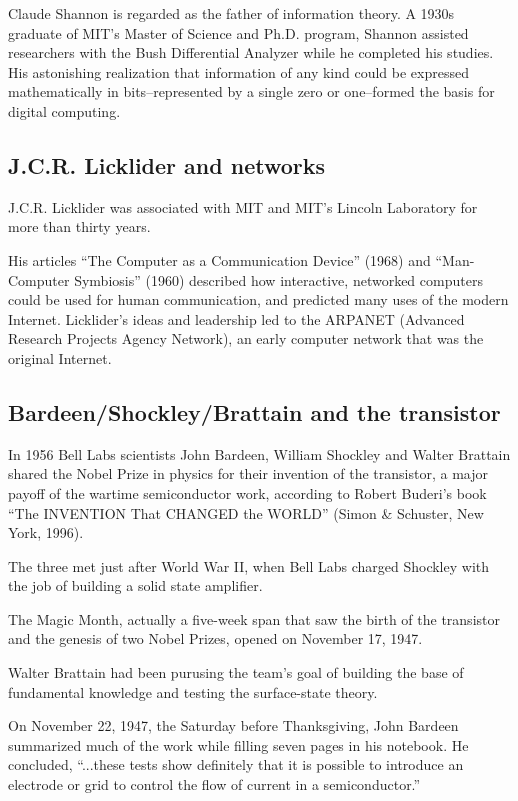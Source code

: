 \documentclass[UKenglish]{ifimaster}  %
\begin{document}
Claude Shannon is regarded as the father of information theory.  A
1930s graduate of MIT's Master of Science and Ph.D. program, Shannon
assisted researchers with the Bush Differential Analyzer while he
completed his studies.  His astonishing realization that information
of any kind could be expressed mathematically in bits--represented by
a single zero or one--formed the basis for digital computing.

\subsection{J.C.R. Licklider and networks}

J.C.R. Licklider was associated with MIT and MIT's Lincoln Laboratory
for more than thirty years.

His articles ``The Computer as a Communication Device'' (1968) and
``Man-Computer Symbiosis'' (1960) described how interactive, networked
computers could be used for human communication, and predicted many
uses of the modern Internet.  Licklider's ideas and leadership led to
the ARPANET (Advanced Research Projects Agency Network), an early
computer network that was the original Internet.

\subsection{Bardeen/Shockley/Brattain and the transistor}

In 1956 Bell Labs scientists John Bardeen, William Shockley and Walter
Brattain shared the Nobel Prize in physics for their invention of the
transistor, a major payoff of the wartime semiconductor work,
according to Robert Buderi's book ``The INVENTION That CHANGED the
WORLD'' (Simon & Schuster, New York, 1996).

The three met just after World War II, when Bell Labs charged Shockley
with the job of building a solid state amplifier.

The Magic Month, actually a five-week span that saw the birth of the
transistor and the genesis of two Nobel Prizes, opened on November 17, 1947.

Walter Brattain had been purusing the team's goal of building the base of
fundamental knowledge and testing the surface-state theory.

On November 22, 1947, the Saturday before Thanksgiving, John Bardeen summarized much of the work while filling seven pages in his notebook.  He concluded, ``...these tests show definitely that it is possible to introduce an electrode or grid to control the flow of current in a semiconductor.''
\end{document}
